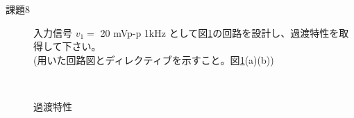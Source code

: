 \begin{description}
  \item[課題8] 入力信号 $v_1 =$ 20 mVp-p 1kHz として図\ref{kouryu}の回路を設計し、過渡特性を取得して下さい。 \\
  (用いた回路図とディレクティブを示すこと。図\ref{kouryu}(a)(b))
\end{description}

\begin{figure}[htb]
  \begin{center}
  ~
  \caption{過渡特性}
  \label{kouryu}
  \end{center}
\end{figure}

